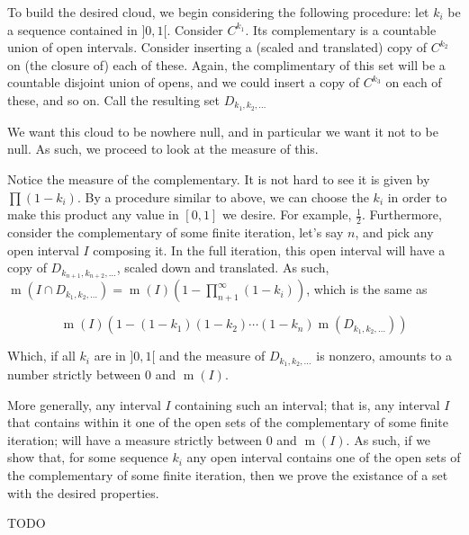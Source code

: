 \documentclass{article}
\DeclareMathOperator{\m}{m}
\begin{document}
	To build the desired cloud, we begin considering the following procedure: let $k_i$ be a sequence contained in $]0,1[$. Consider $C^{k_1}$. Its complementary is a countable union of open intervals. Consider inserting a (scaled and translated) copy of $C^{k_2}$ on (the closure of) each of these. Again, the complimentary of this set will be a countable disjoint union of opens, and we could insert a copy of $C^{k_3}$ on each of these, and so on. Call the resulting set $D_{k_1, k_2, \ldots}$
	
	We want this cloud to be nowhere null, and in particular we want it not to be null. As such, we proceed to look at the measure of this.
	
	Notice the measure of the complementary. It is not hard to see it is given by $\prod (1 - k_i)$. By a procedure similar to above, we can choose the $k_i$ in order to make this product any value in $[0,1]$ we desire. For example, $\frac 1 2$. Furthermore, consider the complementary of some finite iteration, let's say $n$, and pick any open interval $I$ composing it. In the full iteration, this open interval will have a copy of $D_{k_{n+1}, k_{n+2}, \ldots}$, scaled down and translated. As such, $\m(I \cap D_{k_1, k_2, \ldots}) = \m(I) (1 - \prod_{n+1}^\infty (1 - k_i))$, which is the same as
	
	\[\m(I) (1 - (1 - k_1)(1-k_2)\cdots(1-k_n) \m(D_{k_1, k_2, \ldots}))\]
	
	Which, if all $k_i$ are in $]0,1[$ and the measure of $D_{k_1, k_2, \ldots}$ is nonzero, amounts to a number strictly between 0 and $\m(I)$.
	
	More generally, any interval $I$ containing such an interval; that is, any interval $I$ that contains within it one of the open sets of the complementary of some finite iteration; will have a measure strictly between 0 and $\m(I)$. As such, if we show that, for some sequence $k_i$ any open interval contains one of the open sets of the complementary of some finite iteration, then we prove the existance of a set with the desired properties.
	
	TODO
\end{document}
